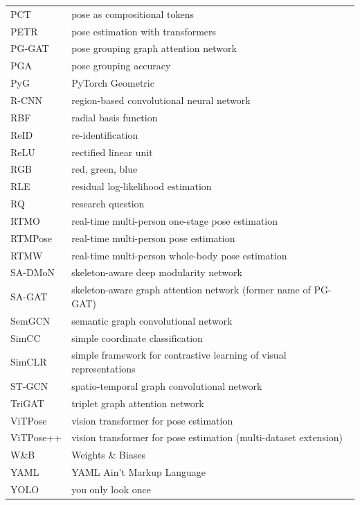 {\begin{longtable}{p{3cm}l}
    PCT            & pose as compositional tokens \\
    PETR           & pose estimation with transformers \\
    PG-GAT         & pose grouping graph attention network \\
    PGA            & pose grouping accuracy \\
    PyG            & PyTorch Geometric \\
    R-CNN          & region-based convolutional neural network \\
    RBF            & radial basis function \\
    ReID           & re-identification \\
    ReLU           & rectified linear unit \\
    RGB            & red, green, blue \\
    RLE            & residual log-likelihood estimation \\
    RQ             & research question \\
    RTMO           & real-time multi-person one-stage pose estimation \\
    RTMPose        & real-time multi-person pose estimation \\
    RTMW           & real-time multi-person whole-body pose estimation \\
    SA-DMoN        & skeleton-aware deep modularity network \\
    SA-GAT         & skeleton-aware graph attention network (former name of PG-GAT) \\
    SemGCN         & semantic graph convolutional network \\
    SimCC          & simple coordinate classification \\
    SimCLR         & simple framework for contrastive learning of visual representations \\
    ST-GCN         & spatio-temporal graph convolutional network \\
    TriGAT         & triplet graph attention network \\
    ViTPose        & vision transformer for pose estimation \\
    ViTPose++      & vision transformer for pose estimation (multi-dataset extension) \\
    W\&B           & Weights \& Biases \\
    YAML           & YAML Ain't Markup Language \\
    YOLO           & you only look once \\
  \end{longtable}

  \newpage
}

